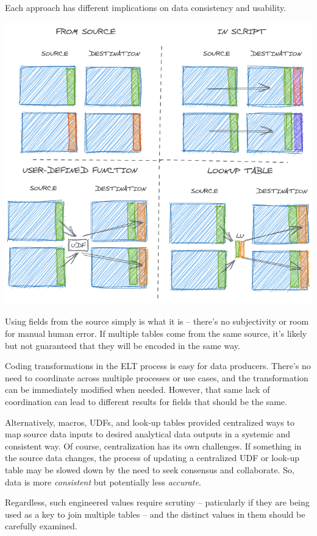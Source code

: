 \documentclass[
]{krantz}
\begin{document}
Each approach has different implications on data consistency and usability.

\begin{center}\includegraphics[width=0.9\linewidth]{figures/data-dall/field-encoding} \end{center}

Using fields from the source simply is what it is -- there's no subjectivity or room for manual human error. If multiple tables come from the same source, it's likely but not guaranteed that they will be encoded in the same way.

Coding transformations in the ELT process is easy for data producers. There's no need to coordinate across multiple processes or use cases, and the transformation can be immediately modified when needed. However, that same lack of coordination can lead to different results for fields that should be the same.

Alternatively, macros, UDFs, and look-up tables provided centralized ways to map source data inputs to desired analytical data outputs in a systemic and consistent way. Of course, centralization has its own challenges. If something in the source data changes, the process of updating a centralized UDF or look-up table may be slowed down by the need to seek consensus and collaborate. So, data is more \emph{consistent} but potentially less \emph{accurate}.

Regardless, such engineered values require scrutiny -- paticularly if they are being used as a key to join multiple tables -- and the distinct values in them should be carefully examined.
\end{document}

